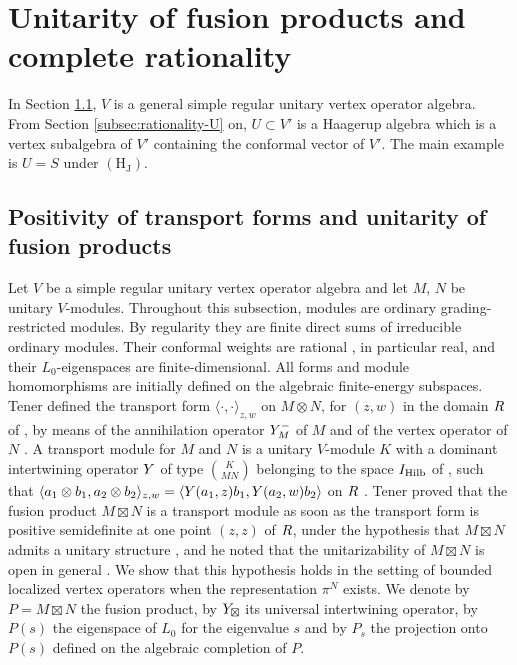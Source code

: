 \documentclass[leqno]{article}
\let\cal\relax
\newcommand{\cal}{\mathcal}
\newcommand{\ot}{\otimes}
\numberwithin{equation}{section}
\begin{document}
\section{Unitarity of fusion products and complete rationality}
\label{sec:rationality}

In Section \ref{subsec:krein}, $V$ is a general simple regular unitary vertex operator algebra. From Section \ref{subsec:rationality-U} on, $U \subset V'$ is a Haagerup algebra which is a vertex subalgebra of $V'$ containing the conformal vector of $V'$. The main example is $U = S$ under $\mathrm{(H_J)}$.

\subsection{Positivity of transport forms and unitarity of fusion products}
\label{subsec:krein}

Let $V$ be a simple regular unitary vertex operator algebra and let $M$, $N$ be unitary $V$-modules. Throughout this subsection, modules are ordinary grading-restricted modules. By regularity they are finite direct sums of irreducible ordinary modules. Their conformal weights are rational \cite[Theorem 11.3 p.~48]{DLM00}, in particular real, and their $L_0$-eigenspaces are finite-dimensional. All forms and module homomorphisms are initially defined on the algebraic finite-energy subspaces. Tener defined the transport form $\langle \cdot,\cdot\rangle_{z,w}$ on $M \ot N$, for $(z,w)$ in the domain $\cal R$ of \cite[(3.5) p.~24]{Ten24}, by means of the annihilation operator $\cal Y^-_M$ of $M$ and of the vertex operator of $N$ \cite[Definition 3.1 p.~25]{Ten24}. A transport module for $M$ and $N$ is a unitary $V$-module $K$ with a dominant intertwining operator $\cal Y$ of type $\binom{K}{M N}$ belonging to the space $\cal I_{\mathrm{Hilb}}$ of \cite[Definition 2.8 p.~12]{Ten24}, such that $\langle a_1 \ot b_1,a_2 \ot b_2\rangle_{z,w} = \langle \cal Y(a_1,z)b_1,\cal Y(a_2,w)b_2\rangle$ on $\cal R$ \cite[Definition 3.3 p.~26]{Ten24}. Tener proved that the fusion product $M \boxtimes N$ is a transport module as soon as the transport form is positive semidefinite at one point $(z,z)$ of $\cal R$, under the hypothesis that $M \boxtimes N$ admits a unitary structure \cite[Proposition 3.16 p.~36]{Ten24}, and he noted that the unitarizability of $M \boxtimes N$ is open in general \cite[Remark 3.18 p.~37]{Ten24}. We show that this hypothesis holds in the setting of bounded localized vertex operators when the representation $\pi^N$ exists. We denote by $P = M \boxtimes N$ the fusion product, by $\cal Y_\boxtimes$ its universal intertwining operator, by $P(s)$ the eigenspace of $L_0$ for the eigenvalue $s$ and by $P_s$ the projection onto $P(s)$ defined on the algebraic completion of $P$.
\end{document}
